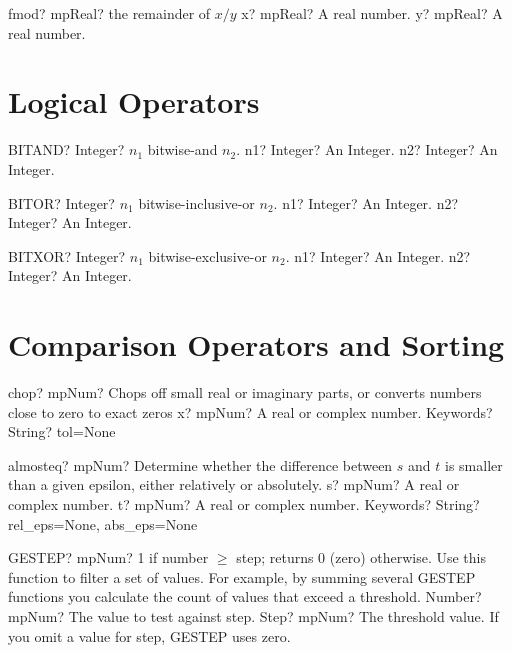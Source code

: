 \documentclass[12pt,a4paper,openany]{book}
\begin{document}
\begin{mpFunctionsExtract}
\mpFunctionTwo
{fmod? mpReal? the remainder of $x/y$}
{x? mpReal? A real number.}
{y? mpReal? A real number.}
\end{mpFunctionsExtract}

\section{Logical Operators }

\begin{mpFunctionsExtract}
\mpWorksheetFunctionTwoNotImplemented
{BITAND? Integer? $n_1$ bitwise-and $n_2$.}
{n1? Integer? An Integer.}
{n2? Integer? An Integer.}
\end{mpFunctionsExtract}

\begin{mpFunctionsExtract}
\mpWorksheetFunctionTwoNotImplemented
{BITOR? Integer? $n_1$ bitwise-inclusive-or $n_2$.}
{n1? Integer? An Integer.}
{n2? Integer? An Integer.}
\end{mpFunctionsExtract}

\begin{mpFunctionsExtract}
\mpWorksheetFunctionTwoNotImplemented
{BITXOR? Integer? $n_1$ bitwise-exclusive-or $n_2$.}
{n1? Integer? An Integer.}
{n2? Integer? An Integer.}
\end{mpFunctionsExtract}

\section{Comparison Operators and Sorting}

\begin{mpFunctionsExtract}
\mpFunctionTwo
{chop? mpNum? Chops off small real or imaginary parts, or converts numbers close to zero to exact zeros}
{x? mpNum? A real or complex number.}
{Keywords? String? tol=None}
\end{mpFunctionsExtract}

\begin{mpFunctionsExtract}
\mpFunctionThree
{almosteq? mpNum? Determine whether the difference between $s$ and $t$ is smaller than a given epsilon, either relatively or absolutely.}
{s? mpNum? A real or complex number.}
{t? mpNum? A real or complex number.}
{Keywords? String? rel\_eps=None, abs\_eps=None}
\end{mpFunctionsExtract}

\begin{mpFunctionsExtract}
\mpWorksheetFunctionTwoNotImplemented
{GESTEP? mpNum?  1 if number $\geq$ step; returns 0 (zero) otherwise. Use this function to filter a set of values. For example, by summing several GESTEP functions you calculate the count of values that exceed a threshold.}
{Number? mpNum? The value to test against step.}
{Step? mpNum? The threshold value. If you omit a value for step, GESTEP uses zero.}
\end{mpFunctionsExtract}
\end{document}
